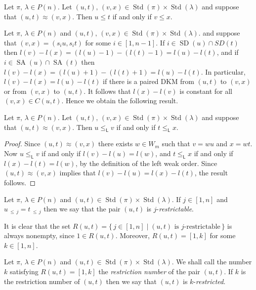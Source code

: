 \documentclass[ALCO,ThmDefs,Unicode,epreuves]{cedram}
\newcommand{\lside}{_{\mathsf{L}}}
\newcommand{\Lessthan}[2]{#1\,{_{\leqslant\,#2}}}
\DeclareMathOperator{\STD}{Std}
\DeclareMathOperator{\SD}{SD}
\DeclareMathOperator{\SA}{SA}
\begin{document}
\begin{prop}\label{bruhatorderpreserved}
Let $\pi,\,\lambda\in P(n)$. Let $(u,t),\,(v,x)\in \STD(\pi)\times\STD(\lambda)$ and
suppose that $(u,t)\approx (v,x)$. Then $u\leqslant t$ if and only if
$v\leqslant x$.
\end{prop}
Let $\pi,\,\lambda\in P(n)$ and $(u,t),\,(v,x)\in \STD(\pi)\times\STD(\lambda)$.
and suppose that $(v,x) = (s_iu,s_it)$ for some $i\in [1,n-1]$. If
$i\in \SD(u)\cap SD(t)$ then $l(v)-l(x)=(l(u)-1)-(l(t)-1) = l(u)-l(t)$, and
if $i\in \SA(u)\cap\SA(t)$ then $l(v)-l(x)=(l(u)+1)-(l(t)+1) = l(u)-l(t)$.
In particular, $l(v)-l(x)=l(u)-l(t)$ if there is a paired DKM
from $(u,t)$ to $(v,x)$ or from $(v,x)$ to $(u,t)$. It follows
that $l(x)-l(v)$ is constant for all $(v,x)\in C(u,t)$. Hence we
obtain the following result.

\begin{prop}\label{weakorderpreserved}
Let $\pi,\,\lambda\in P(n)$. Let $(u,t),\,(v,x)\in \STD(\pi)\times\STD(\lambda)$ and
suppose that $(u,t)\approx (v,x)$. Then $u\leqslant\lside v$ if and only if
$t\leqslant\lside x$.
\end{prop}
\begin{proof}
Since $(u,t)\approx (v,x)$ there exists $w\in W_m$ such that $v=wu$
and $x=wt$. Now
$u\leqslant\lside v$ if and only if $l(v)-l(u)=l(w)$, and
$t\leqslant\lside x$ if and only if $l(x)-l(t)=l(w)$,
by the definition of the left weak order. Since
$(u,t)\approx (v,x)$ implies that $l(v)-l(u)=l(x)-l(t)$, the result
follows.
\end{proof}

\begin{defi}\label{k-restrictable-ed}
Let $\pi,\,\lambda\in P(n)$ and $(u,t)\in\STD(\pi)\times\STD(\lambda)$.
If $j\in [1,n]$ and $\Lessthan uj=\Lessthan tj$ then we say that the
pair $(u,t)$ is $j$-\emph{restrictable}.
\end{defi}

\begin{rema}\label{k-restrictable-rem}
It is clear that the set
$R(u,t)=\{\,j\in[1,n]\mid (u,t)\text{ is }j\text{-restrictable}\,\}$
is always nonempty, since $1\in R(u,t)$. Moreover, $R(u,t)=[1,k]$ for
some $k\in [1,n]$.
\end{rema}

\begin{defi}\label{restrictedNumber}
Let $\pi,\,\lambda\in P(n)$ and $(u,t)\in\STD(\pi)\times\STD(\lambda)$.
We shall call the number $k$ satisfying $R(u,t)=[1,k]$
the \emph{restriction number} of the pair $(u,t)$. If $k$ is the
restriction number of $(u,t)$ then we say that $(u,t)$ is
$k$-\emph{restricted}.
\end{defi}
\end{document}
